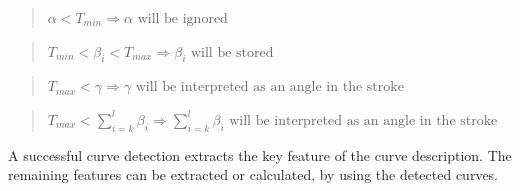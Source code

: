 \begin{quote}
\(
  \alpha < T_{min} \Rightarrow \alpha \text{ will be ignored}
\)
\end{quote}
\begin{quote}
\(
  T_{min} < \beta_{i} < T_{max} \Rightarrow \beta_{i} \text{ will be stored}
\)
\end{quote}
\begin{quote}
\(
  T_{max} < \gamma \Rightarrow 
                  \gamma \text{ will be interpreted as an angle in the stroke}
\)
\end{quote}
\begin{quote}
\(
  T_{max} < \sum\limits_{i=k}^{l} \beta_{i} \Rightarrow 
                               \sum\limits_{i=k}^{l} \beta_{i}
                               \text{ will be interpreted as an 
                               angle in the stroke}
\)
\end{quote}
A successful curve detection extracts the key feature of the curve 
description. The remaining features can be extracted or calculated,
by using the detected curves.

